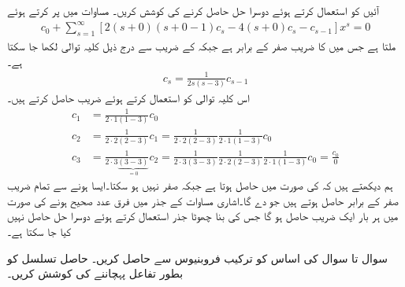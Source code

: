 آئیں  کو استعمال کرتے ہوئے دوسرا حل حاصل کرنے کی کوشش کریں۔  مساوات  میں  پر کرتے ہوئے
\begin{multline*}
[2\cdot 0(0-1)-4\cdot 0]c_0+\sum_{s=1}^{\infty}[2 (s+0)(s+0-1)c_s-4(s+0)c_s-c_{s-1}]x^{s}=0
\end{multline*}
ملتا ہے جس میں  کا  ضریب  صفر کے برابر ہے جبکہ  کے  ضریب  سے درج ذیل کلیہ توالی لکھا جا سکتا ہے۔
\begin{align*}
c_s=\frac{1}{2s(s-3)}c_{s-1}
\end{align*}
اس کلیہ توالی کو استعمال کرتے ہوئے  ضریب  حاصل کرتے ہیں۔
\begin{align*}
c_1&=\frac{1}{2\cdot 1(1-3)}c_0\\
c_2&=\frac{1}{2\cdot 2(2-3)}c_1=\frac{1}{2\cdot 2(2-3)}\frac{1}{2\cdot 1(1-3)}c_0\\
c_3&=\frac{1}{2\cdot 3\underbrace{(3-3)}_{=0}}c_2=\frac{1}{2\cdot 3(3-3)}\frac{1}{2\cdot 2(2-3)}\frac{1}{2\cdot 1(1-3)}c_0=\frac{c_0}{0}
\end{align*}
ہم دیکھتے ہیں کہ  کی صورت میں  حاصل ہوتا ہے جبکہ  صفر نہیں ہو سکتا۔ایسا ہونے سے تمام  ضریب  صفر کے برابر حاصل ہوتے ہیں جو  دے گا۔اشاری مساوات کے جذر میں فرق عدد صحیح ہونے کی صورت میں ہر بار ایک  ضریب   حاصل ہو گا جس کی بنا چھوٹا جذر استعمال کرتے ہوئے دوسرا حل حاصل نہیں کیا جا سکتا ہے۔

سوال  تا سوال  کی اساس کو ترکیب فروبنیوس سے حاصل کریں۔ حاصل تسلسل کو بطور تفاعل پہچاننے کی کوشش کریں۔\\

